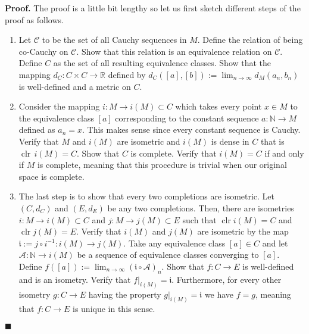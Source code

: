 \documentclass[10pt]{article}
\theoremstyle{definition}
\theoremstyle{remark}
\newenvironment{prf}{\noindent\textbf{Proof.}}{\hfill$\blacksquare$}
\DeclareMathOperator{\clr}{\text{clr}}
\begin{document}
\begin{prf}
The proof is a little bit lengthy so let us first sketch different steps of the proof as follows.
\begin{enumerate}
\item 
Let $\mathscr{C}$ to be the set of all Cauchy sequences in $M$. Define the relation of being co-Cauchy on $\mathscr{C}$. Show that this relation is an equivalence relation on $\mathscr{C}$. Define $C$ as the set of all resulting equivalence classes. Show that the mapping $d_C:C\times C \to \mathbb{R}$ defined by $d_C([a],[b]):=\lim_{n\to\infty}d_M(a_n,b_n)$ is well-defined and a metric on $C$.
\item
Consider the mapping $i:M\to i(M)\subset C$ which takes every point $x\in M$ to the equivalence class $[a]$ corresponding to the constant sequence $a:\mathbb{N}\to M$ defined as $a_n=x$. This makes sense since every constant sequence is Cauchy. Verify that $M$ and $i(M)$ are isometric and $i(M)$ is dense in $C$ that is $\clr\,i(M) = C$. Show that $C$ is complete. Verify that $i(M)=C$ if and only if $M$ is complete, meaning that this procedure is trivial when our original space is complete.
\item
The last step is to show that every two completions are isometric. Let $(C,d_C)$ and $(E,d_E)$ be any two completions. Then, there are isometries $i:M\to i(M)\subset C$ and $j:M\to j(M)\subset E$ such that $\clr i(M)=C$ and $\clr j(M)=E$. Verify that $i(M)$ and $j(M)$ are isometric by the map $\mathfrak{i}:=j\circ i^{-1}:i(M)\to j(M)$. Take any equivalence class $[a]\in C$ and let $\mathcal{A}:\mathbb{N}\to i(M)$ be a sequence of equivalence classes converging to $[a]$. Define $f([a]):=\lim_{n\to\infty}(\mathfrak{i}\circ\mathcal{A})_n$. Show that $f:C\to E$ is well-defined and is an isometry. Verify that $f|_{i(M)}=\mathfrak{i}$. Furthermore, for every other isometry $g:C\to E$ having the property $g|_{i(M)}=\mathfrak{i}$ we have $f=g$, meaning that $f:C\to E$ is unique in this sense.
\end{enumerate}


\end{prf}
\end{document}
